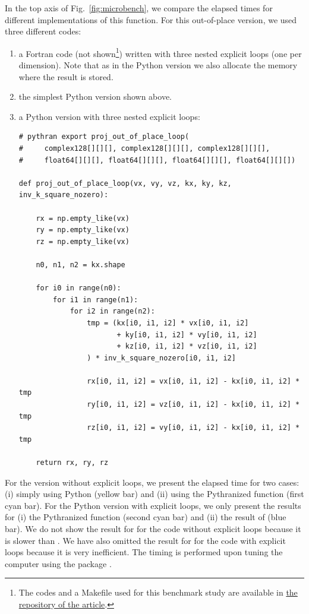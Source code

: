 \documentclass{../jors}
\begin{document}
In the top axis of Fig.~\ref{fig:microbench}, we compare the elapsed times for
different implementations of this function.
%
For this out-of-place version, we used three different codes:
\begin{enumerate}
\item a Fortran code (not shown\footnote{The codes and a Makefile used for this
benchmark study are available in \href{%
https://bitbucket.org/fluiddyn/fluiddyn_paper/src/default/fluidfft/microbench/}{%
the repository of the article}.}) written with three nested explicit loops (one
per dimension). Note that as in the Python version we also allocate the memory
where the result is stored.
\item the simplest Python version shown above.
\item a Python version with three nested explicit loops:
\begin{verbatim}
# pythran export proj_out_of_place_loop(
#     complex128[][][], complex128[][][], complex128[][][],
#     float64[][][], float64[][][], float64[][][], float64[][][])

def proj_out_of_place_loop(vx, vy, vz, kx, ky, kz, inv_k_square_nozero):

    rx = np.empty_like(vx)
    ry = np.empty_like(vx)
    rz = np.empty_like(vx)

    n0, n1, n2 = kx.shape

    for i0 in range(n0):
        for i1 in range(n1):
            for i2 in range(n2):
                tmp = (kx[i0, i1, i2] * vx[i0, i1, i2]
                       + ky[i0, i1, i2] * vy[i0, i1, i2]
                       + kz[i0, i1, i2] * vz[i0, i1, i2]
                ) * inv_k_square_nozero[i0, i1, i2]

                rx[i0, i1, i2] = vx[i0, i1, i2] - kx[i0, i1, i2] * tmp
                ry[i0, i1, i2] = vz[i0, i1, i2] - kx[i0, i1, i2] * tmp
                rz[i0, i1, i2] = vy[i0, i1, i2] - kx[i0, i1, i2] * tmp

    return rx, ry, rz
\end{verbatim}
\end{enumerate}
For the version without explicit loops, we present the elapsed time for two
cases: (i) simply using Python (yellow bar) and (ii) using the Pythranized
function (first cyan bar).
%
For the Python version with explicit loops, we only present the results for (i)
the Pythranized function (second cyan bar) and (ii) the result of 
(blue bar).
%
We do not show the result for  for the code without explicit loops
because it is slower than . We have also omitted the result for
 for the code with explicit loops because it is very inefficient.
%
The timing is performed upon tuning the computer using the package
\href{https://pypi.org/project/perf/}{}.
\end{document}
